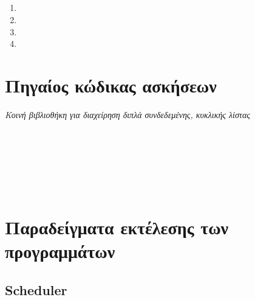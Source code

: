 \documentclass[a4paper,10pt]{article} \usepackage{anysize}
\begin{document}
\subsection{}
\begin{enumerate}
    \item
    \item
    \item
    \item
\end{enumerate}


\vspace{1cm}
\def\thesubsection {Άσκηση \arabic{section}.\arabic{subsection}}
\section*{Πηγαίος κώδικας ασκήσεων}
\emph{Κοινή βιβλιοθήκη για διαχείρηση διπλά συνδεδεμένης, κυκλικής λίστας}
\inputminted[linenos,fontsize=\footnotesize,frame=leftline]{c}{files/queue.h}
\inputminted[linenos,fontsize=\footnotesize,frame=leftline]{c}{files/queue.c}
\setcounter{section}{1}
\setcounter{subsection}{0}
\subsection{}
\inputminted[linenos,fontsize=\footnotesize,frame=leftline]{c}{files/scheduler_1.1.c}
\subsection{}
\inputminted[linenos,fontsize=\footnotesize,frame=leftline]{c}{files/scheduler-shell_1.2.c}
\subsection{}
\inputminted[linenos,fontsize=\footnotesize,frame=leftline]{c}{files/scheduler-shell_1.3.c}

\section*{Παραδείγματα εκτέλεσης των προγραμμάτων}
\def\thesubsection {Πρόγραμμα \arabic{section}.\arabic{subsection}:}
\setcounter{subsection}{0}
\subsection{Scheduler}

\end{document}
